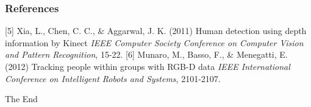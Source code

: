 \documentclass{beamer}
\begin{document}
\begin{frame}
\frametitle{References}
\footnotesize{
\begin{thebibliography}{4}
 [5] Xia, L., Chen, C. C., \& Aggarwal, J. K. (2011)
\newblock Human detection using depth information by Kinect
\newblock \emph{IEEE Computer Society Conference on Computer Vision and Pattern Recognition}, 15-22.
 [6] Munaro, M., Basso, F., \& Menegatti, E. (2012)
\newblock Tracking people within groups with RGB-D data
\newblock \emph{IEEE International Conference on Intelligent Robots and Systems}, 2101-2107.
\end{thebibliography}
}
\end{frame}

\begin{frame}
\Huge{\centerline{The End}}
\end{frame}
\end{document}
